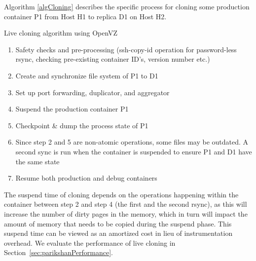 Algorithm \ref{algCloning} describes the specific process for cloning some production container P1 from Host H1 to replica D1 on Host H2.


\begin{algorithm}[ht!]
  \caption{Live cloning algorithm using OpenVZ} 
  \label{algCloning}
  \begin{enumerate}[topsep=0pt,itemsep=-1ex,partopsep=1ex,parsep=1ex]
  \item Safety checks and pre-processing (ssh-copy-id operation for password-less rsync, checking pre-existing container ID's, version number etc.) 
  \item Create and synchronize file system of P1 to D1  
  \item Set up port forwarding, duplicator, and aggregator
  \item Suspend the production container P1
  \item Checkpoint \& dump the process state of P1
  \item Since step 2 and 5 are non-atomic operations, some files may be outdated.
A second sync is run when the container is suspended to ensure P1 and D1 have the same state
  \item Resume both production and debug containers
  \end{enumerate}
\end{algorithm}


The suspend time of cloning depends on the operations happening within the container between step 2 and step 4 (the first and the second rsync), as this will increase the number of dirty pages in the memory, which in turn will impact the amount of memory that needs to be copied during the suspend phase.
This suspend time can be viewed as an amortized cost in lieu of instrumentation overhead.
We evaluate the performance of live cloning in Section~\ref{sec:parikshanPerformance}.